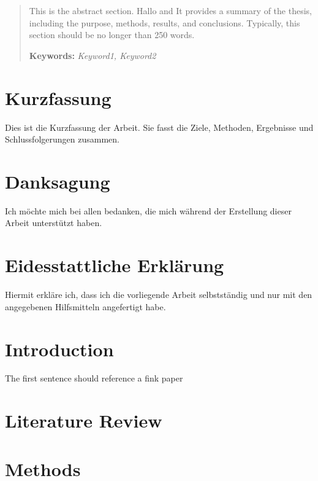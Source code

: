 \documentclass[man]{apa7}
\begin{document}
\maketitlepage

\newpage
\begin{abstract}

This is the abstract section. Hallo and It provides a summary of the thesis, including the purpose, methods, results, and conclusions. Typically, this section should be no longer than 250 words.

\vspace{2mm}

\noindent\textbf{Keywords:} \textit{Keyword1, Keyword2}

\vspace{5mm}

\end{abstract}

\newpage
\section*{Kurzfassung}
Dies ist die Kurzfassung der Arbeit. Sie fasst die Ziele, Methoden, Ergebnisse und Schlussfolgerungen zusammen.

\newpage
\section*{Danksagung}
Ich möchte mich bei allen bedanken, die mich während der Erstellung dieser Arbeit unterstützt haben.

\newpage
\section*{Eidesstattliche Erklärung}
Hiermit erkläre ich, dass ich die vorliegende Arbeit selbstständig und nur mit den angegebenen Hilfsmitteln angefertigt habe.

\newpage
\tableofcontents
\newpage

\newpage
\section{Introduction}
The first sentence should reference a fink paper \cite{Fink2021}
\lipsum[1-4] %

\section{Literature Review}
\lipsum[5-8]

\section{Methods}
\lipsum[9-12]
\end{document}
